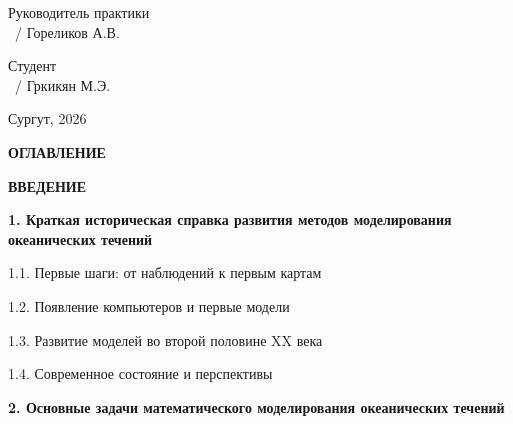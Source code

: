 \documentclass[a4paper,14pt]{extarticle}
\begin{document}
\vfill

\noindent
\begin{minipage}[t]{0.48\textwidth}
    Руководитель практики \\
    \vspace{1cm}
    \hrulefill\ / Гореликов А.В.
\end{minipage}
\hfill
\begin{minipage}[t]{0.48\textwidth}
    Студент \\
    \vspace{1cm}
    \hrulefill\ / Гркикян М.Э.
\end{minipage}

\vspace{1cm}
\begin{center}
    Сургут, 2026
\end{center}

\newpage


\begin{center}
    \textbf{\Large ОГЛАВЛЕНИЕ}
\end{center}

\vspace{0.5cm}

\newcommand{\tocline}[2]{%
    \noindent
    \begin{minipage}[t]{0.75\textwidth}
        \raggedright #1
    \end{minipage}
    \hfill
    \begin{minipage}[t]{0.1\textwidth}
        \raggedleft #2
    \end{minipage}
    \par
}

\tocline{\textbf{ВВЕДЕНИЕ}}{4}
\vspace{0.3cm}
\noindent \textbf{1. Краткая историческая справка развития методов моделирования океанических течений}

\tocline{\hspace{0.5cm} 1.1. Первые шаги: от наблюдений к первым картам}{5}
\tocline{\hspace{0.5cm} 1.2. Появление компьютеров и первые модели}{5}
\tocline{\hspace{0.5cm} 1.3. Развитие моделей во второй половине XX века}{6}
\tocline{\hspace{0.5cm} 1.4. Современное состояние и перспективы}{6}
\vspace{0.3cm}
\noindent \textbf{2. Основные задачи математического моделирования океанических течений}
\end{document}
